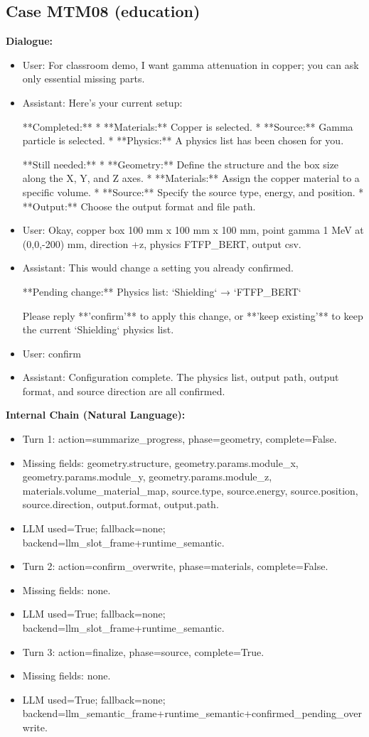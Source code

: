 \documentclass[11pt]{ctexart}
\begin{document}
\subsection{Case MTM08 (education)}
\textbf{Dialogue:}
\begin{itemize}
\item User: For classroom demo, I want gamma attenuation in copper; you can ask only essential missing parts.
\item Assistant: Here's your current setup:

**Completed:**
*   **Materials:** Copper is selected.
*   **Source:** Gamma particle is selected.
*   **Physics:** A physics list has been chosen for you.

**Still needed:**
*   **Geometry:** Define the structure and the box size along the X, Y, and Z axes.
*   **Materials:** Assign the copper material to a specific volume.
*   **Source:** Specify the source type, energy, and position.
*   **Output:** Choose the output format and file path.
\item User: Okay, copper box 100 mm x 100 mm x 100 mm, point gamma 1 MeV at (0,0,-200) mm, direction +z, physics FTFP\_BERT, output csv.
\item Assistant: This would change a setting you already confirmed.

**Pending change:**
Physics list: `Shielding` → `FTFP\_BERT`

Please reply **'confirm'** to apply this change, or **'keep existing'** to keep the current `Shielding` physics list.
\item User: confirm
\item Assistant: Configuration complete. The physics list, output path, output format, and source direction are all confirmed.
\end{itemize}
\textbf{Internal Chain (Natural Language):}
\begin{itemize}
\item Turn 1: action=summarize\_progress, phase=geometry, complete=False.
\item Missing fields: geometry.structure, geometry.params.module\_x, geometry.params.module\_y, geometry.params.module\_z, materials.volume\_material\_map, source.type, source.energy, source.position, source.direction, output.format, output.path.
\item LLM used=True; fallback=none; backend=llm\_slot\_frame+runtime\_semantic.
\item Turn 2: action=confirm\_overwrite, phase=materials, complete=False.
\item Missing fields: none.
\item LLM used=True; fallback=none; backend=llm\_slot\_frame+runtime\_semantic.
\item Turn 3: action=finalize, phase=source, complete=True.
\item Missing fields: none.
\item LLM used=True; fallback=none; backend=llm\_semantic\_frame+runtime\_semantic+confirmed\_pending\_overwrite.
\end{itemize}
\end{document}
